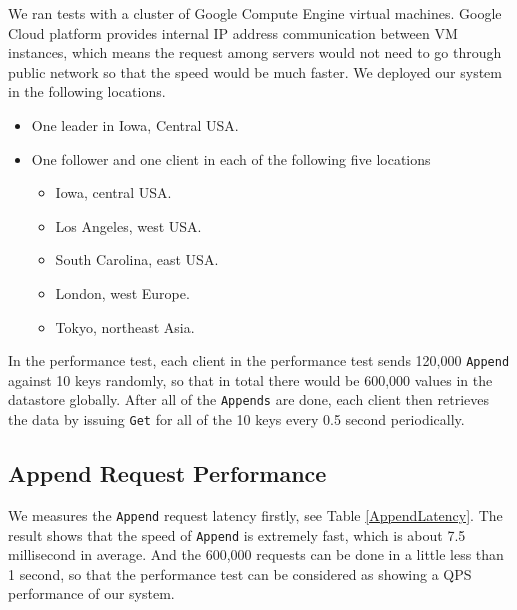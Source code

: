 \documentclass[11pt,english,twocolumn]{article}
\begin{document}
We ran tests with a cluster of Google Compute Engine virtual
machines. Google Cloud platform provides internal IP address communication between VM instances, which means the request among servers would not need to go through public network so that the speed would be much faster. We deployed our system in the following locations.
\begin{itemize}
    \vspace{-0.4cm}
	\item One leader in Iowa, Central USA.
	\vspace{-0.4cm}
	\item One follower and one client in each of the following five locations
\vspace{-0.3cm}
    \begin{itemize}
    \item Iowa, central USA.
\vspace{-0.3cm}
	\item Los Angeles, west USA.
\vspace{-0.3cm}
	\item South Carolina, east USA.
\vspace{-0.3cm}
    \item London, west Europe.
\vspace{-0.3cm}
    \item Tokyo, northeast Asia.
\vspace{-0.3cm}
    \end{itemize}
\end{itemize}

In the performance test, each client in the performance test sends 120,000 \texttt{Append} against 10 keys randomly, so that in total there would be 600,000 values in the datastore globally. After all of the \texttt{Appends} are done, each client then retrieves the data by issuing \texttt{Get} for all of the 10 keys every 0.5 second periodically.

 \vspace{-0.5cm}
\subsection{Append Request Performance}
We measures the \texttt{Append} request latency firstly, see Table \ref{AppendLatency}. The result shows that the speed of \texttt{Append} is extremely fast, which is about 7.5 millisecond in average. And the 600,000 requests can be done in a little less than 1 second, so that the performance test can be considered as showing a QPS performance of our system.
\end{document}
